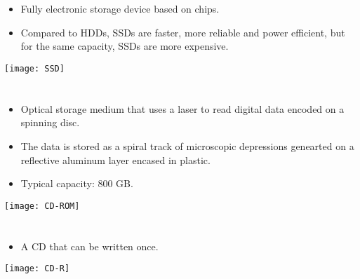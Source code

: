 \section{}
\begin{itemize}
\item Fully electronic storage device based on  chips.
\item Compared to \gls{HDD}s, \gls{SSD}s are faster, more reliable and
  power efficient, but for the same capacity, \gls{SSD}s are more
  expensive.
\end{itemize}
\vspace{-4ex}
\begin{center}
  \texttt{[image: SSD]}
\end{center}

\section{}
\begin{itemize}
\item Optical storage medium that uses a laser to read digital data
  encoded on a spinning disc.
\item The data is stored as a spiral track of microscopic depressions
  genearted on a reflective aluminum layer encased in plastic.
\item Typical capacity: 800 GB.
\end{itemize}
\vspace{-4ex}
\begin{center}
  \texttt{[image: CD-ROM]}
\end{center}
  
\section{}
\begin{itemize}
\item A \gls{CD} that can be written once.
\end{itemize}
\vspace{-4ex}
\begin{center}
  \texttt{[image: CD-R]}
\end{center}

